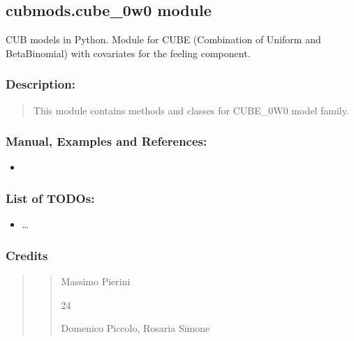 \documentclass[letterpaper,10pt,english]{sphinxmanual}
\begin{document}
\subsection{cubmods.cube\_0w0 module}
\label{\detokenize{cubmods:module-cubmods.cube_0w0}}\label{\detokenize{cubmods:cubmods-cube-0w0-module}}\label{\detokenize{cubmods:cube0w0-module}}
\sphinxAtStartPar
CUB models in Python.
Module for CUBE (Combination of Uniform
and Beta\sphinxhyphen{}Binomial) with covariates for the feeling component.


\subsubsection{Description:}
\label{\detokenize{cubmods:id21}}\begin{quote}

\sphinxAtStartPar
This module contains methods and classes
for CUBE\_0W0 model family.
\end{quote}


\subsubsection{Manual, Examples and References:}
\label{\detokenize{cubmods:id22}}\begin{itemize}
\item {} 
\sphinxAtStartPar
{}

\end{itemize}


\subsubsection{List of TODOs:}
\label{\detokenize{cubmods:id23}}\begin{itemize}
\item {} 
\sphinxAtStartPar
…

\end{itemize}


\subsubsection{Credits}
\label{\detokenize{cubmods:id24}}\begin{quote}
\begin{quote}\begin{description}
\sphinxAtStartPar
Massimo Pierini

\sphinxhyphen{}24

\sphinxAtStartPar
Domenico Piccolo, Rosaria Simone

\sphinxAtStartPar
{}

\end{description}\end{quote}
\end{quote}
\end{document}
